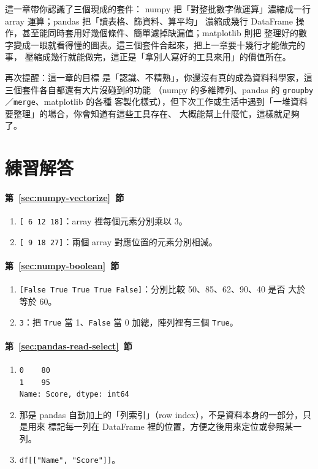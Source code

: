 這一章帶你認識了三個現成的套件：
numpy 把「對整批數字做運算」濃縮成一行 array 運算；pandas 把「讀表格、篩資料、算平均」
濃縮成幾行 DataFrame 操作，甚至能同時套用好幾個條件、簡單濾掉缺漏值；matplotlib 則把
整理好的數字變成一眼就看得懂的圖表。這三個套件合起來，把上一章要十幾行才能做完的事，
壓縮成幾行就能做完，這正是「拿別人寫好的工具來用」的價值所在。

再次提醒：這一章的目標
是「認識、不精熟」，你還沒有真的成為資料科學家，這三個套件各自都還有大片沒碰到的功能
（numpy 的多維陣列、pandas 的 \texttt{groupby}／\texttt{merge}、matplotlib 的各種
客製化樣式），但下次工作或生活中遇到「一堆資料要整理」的場合，你會知道有這些工具存在、
大概能幫上什麼忙，這樣就足夠了。

\section*{練習解答}

\paragraph{第~\ref{sec:numpy-vectorize}~節}
\begin{enumerate}
\item \texttt{[ 6 12 18]}：array 裡每個元素分別乘以 3。
\item \texttt{[ 9 18 27]}：兩個 array 對應位置的元素分別相減。
\end{enumerate}

\paragraph{第~\ref{sec:numpy-boolean}~節}
\begin{enumerate}
\item \texttt{[False  True  True  True False]}：分別比較 50、85、62、90、40 是否
大於等於 60。
\item \texttt{3}：把 \texttt{True} 當 1、\texttt{False} 當 0 加總，陣列裡有三個
\texttt{True}。
\end{enumerate}

\paragraph{第~\ref{sec:pandas-read-select}~節}
\begin{enumerate}
\item
\begin{verbatim}
0    80
1    95
Name: Score, dtype: int64
\end{verbatim}
\item 那是 pandas 自動加上的「列索引」（row index），不是資料本身的一部分，只是用來
標記每一列在 DataFrame 裡的位置，方便之後用來定位或參照某一列。
\item \texttt{df[["Name", "Score"]]}。
\end{enumerate}


